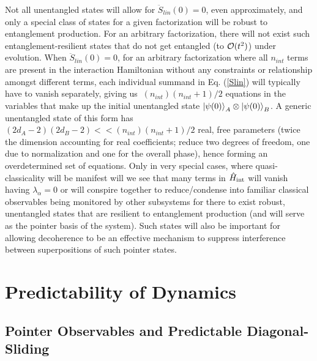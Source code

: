 \documentclass[aps,pra,onecolumn,nofootinbib,12pt,tightenlines]{revtex4-1}
\begin{document}
 Not all unentangled states will allow for $\ddot{S}_{lin}(0) = 0$, even approximately, and only a special class of states for a given factorization will be robust to entanglement production. For an arbitrary factorization, there will not exist such entanglement-resilient states that do not get entangled (to $\mathcal{O}(t^2)$) under evolution. When $\ddot{S}_{lin}(0) = 0$, for an arbitrary factorization where all $n_{int}$ terms are present in the interaction Hamiltonian without any constraints or relationship amongst different terms, each individual summand in Eq. (\ref{Slin}) will typically have to vanish separately, giving us $~ (n_{int})(n_{int} + 1)/2$ equations in the variables that make up the initial unentangled state $\ket{\psi(0)}_{A} \otimes \ket{\psi(0)}_{B}$. A generic unentangled state of this form has $(2d_{A} - 2)(2d_{B} -2) << (n_{int})(n_{int} + 1)/2$ real, free parameters (twice the dimension accounting for real coefficients; reduce two degrees of freedom, one due to normalization and one for the overall phase), hence forming an overdetermined set of equations. Only in very special cases, where quasi-classicality will be manifest will we see that many terms in $\hat{H}_{\rm{int}}$ will vanish having $\lambda_{\alpha} = 0$ or will conspire together to reduce/condense into familiar classical observables being monitored by other subsystems for there to exist robust, unentangled states that are resilient to entanglement production (and will serve as the pointer basis of the system). Such states will also be important for allowing decoherence to be an effective mechanism to suppress interference between superpositions of such pointer states. 


\section{Predictability of Dynamics}
\label{sec:predictability}

\subsection{Pointer Observables and Predictable Diagonal-Sliding}
\label{sec:pointer}
\end{document}
